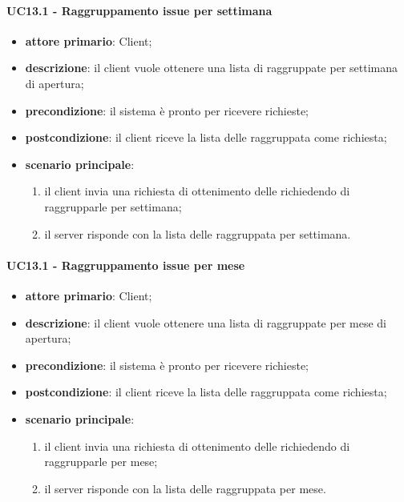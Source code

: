 \paragraph{UC13.1 - Raggruppamento issue per settimana}
\begin{itemize}
	\item \textbf{attore primario}: Client;
	\item \textbf{descrizione}: il client vuole ottenere una lista di  raggruppate per settimana di apertura;
	\item \textbf{precondizione}:  il sistema è pronto per ricevere richieste;
	\item \textbf{postcondizione}: il client riceve la lista delle  raggruppata come richiesta;
	\item \textbf{scenario principale}: 
	\begin{enumerate}
		\item il client invia una richiesta di ottenimento delle  richiedendo di raggrupparle per settimana;
		\item il server risponde con la lista delle  raggruppata per settimana.
	\end{enumerate}
\end{itemize}
\paragraph{UC13.1 - Raggruppamento issue per mese}
\begin{itemize}
	\item \textbf{attore primario}: Client;
	\item \textbf{descrizione}: il client vuole ottenere una lista di  raggruppate per mese di apertura;
	\item \textbf{precondizione}:  il sistema è pronto per ricevere richieste;
	\item \textbf{postcondizione}: il client riceve la lista delle  raggruppata come richiesta;
	\item \textbf{scenario principale}: 
	\begin{enumerate}
		\item il client invia una richiesta di ottenimento delle  richiedendo di raggrupparle per mese;
		\item il server risponde con la lista delle  raggruppata per mese.
	\end{enumerate}
\end{itemize}















